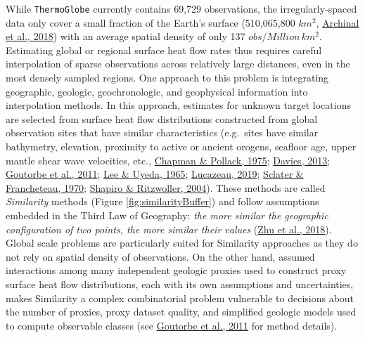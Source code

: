 While \texttt{ThermoGlobe} currently contains 69,729 observations, the irregularly-spaced data only cover a small fraction of the Earth's surface (510,065,800 \(km^2\), \protect\hyperlink{ref-archinal2018}{Archinal et al., 2018}) with an average spatial density of only 137 \(obs/Million\,km^2\). Estimating global or regional surface heat flow rates thus requires careful interpolation of sparse observations across relatively large distances, even in the most densely sampled regions. One approach to this problem is integrating geographic, geologic, geochronologic, and geophysical information into interpolation methods. In this approach, estimates for unknown target locations are selected from surface heat flow distributions constructed from global observation sites that have similar characteristics (e.g.~sites have similar bathymetry, elevation, proximity to active or ancient orogens, seafloor age, upper mantle shear wave velocities, etc., \protect\hyperlink{ref-chapman1975}{Chapman \& Pollack, 1975}; \protect\hyperlink{ref-davies2013}{Davies, 2013}; \protect\hyperlink{ref-goutorbe2011}{Goutorbe et al., 2011}; \protect\hyperlink{ref-lee1965}{Lee \& Uyeda, 1965}; \protect\hyperlink{ref-lucazeau2019}{Lucazeau, 2019}; \protect\hyperlink{ref-sclater1970}{Sclater \& Francheteau, 1970}; \protect\hyperlink{ref-shapiro2004}{Shapiro \& Ritzwoller, 2004}). These methods are called \emph{Similarity} methods (Figure \ref{fig:similarityBuffer}) and follow assumptions embedded in the Third Law of Geography: \emph{the more similar the geographic configuration of two points, the more similar their values} (\protect\hyperlink{ref-zhu2018}{Zhu et al., 2018}). Global scale problems are particularly suited for Similarity approaches as they do not rely on spatial density of observations. On the other hand, assumed interactions among many independent geologic proxies used to construct proxy surface heat flow distributions, each with its own assumptions and uncertainties, makes Similarity a complex combinatorial problem vulnerable to decisions about the number of proxies, proxy dataset quality, and simplified geologic models used to compute observable classes (see \protect\hyperlink{ref-goutorbe2011}{Goutorbe et al., 2011} for method details).



